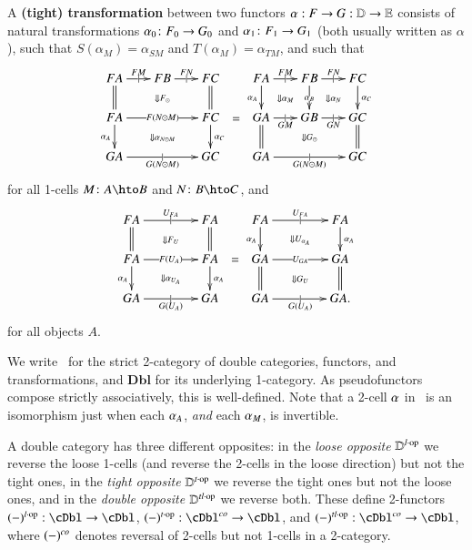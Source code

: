 \begin{defn}\label{thm:dbl-transf}
  A \textbf{(tight) transformation} between two functors $\alpha:
  F\to G:\mathbb{D}\to\mathbb{E}$ consists of natural transformations $\alpha_0\colon
  F_0\to G_0$ and $\alpha_1\colon F_1\to G_1$ (both usually written as
  $\alpha$), such that $S(\alpha_{M}) = \alpha_{SM}$ and
  $T(\alpha_{M}) = \alpha_{TM}$, and such that
  \[\vcenter{\xymatrix@-.5pc{
      FA \ar@{=}[d] \ar[r]|{|}^{FM}
      \ar@{}[drr]|{\Downarrow F_\odot} &
      FB \ar[r]|{|}^{FN} &
      FC \ar@{=}[d]\\
      FA \ar[rr]|{F(N\odot M)} \ar[d]_{\alpha_A}
      \ar@{}[drr]|{\Downarrow \alpha_{N\odot M}} &&
      FC \ar[d]^{\alpha_C}\\
      GA \ar[rr]|{|}_{G(N\odot M)} && GC
    }} =
  \vcenter{\xymatrix@-.5pc{
      FA \ar[d]_{\alpha_A} \ar@{}[dr]|{\Downarrow \alpha_M} \ar[r]|{|}^{FM} &
      FB \ar[d]|{\alpha_B} \ar@{}[dr]|{\Downarrow \alpha_N} \ar[r]|{|}^{FN} &
      FC \ar[d]^{\alpha_C}\\
      GA \ar@{=}[d] \ar[r]|{|}_{GM} \ar@{}[drr]|{\Downarrow G_\odot} &
      GB \ar[r]|{|}_{GN} &
      GC \ar@{=}[d]\\
      GA \ar[rr]|{|}_{G(N\odot M)} && GC
    }}\]
  for all 1-cells $M\colon A\hto B$ and $N\colon B\hto C$, and
  \[\vcenter{\xymatrix@-.5pc{
      FA \ar[rr]|{|}^{U_{FA}} \ar@{=}[d]
      \ar@{}[drr]|{\Downarrow F_U} &&
      FA \ar@{=}[d]\\
      FA \ar[rr]|{F(U_A)} \ar[d]_{\alpha_A}
      \ar@{}[drr]|{\Downarrow \alpha_{U_A}} &&
      FA \ar[d]^{\alpha_A}\\
      GA \ar[rr]|{|}_{G(U_A)} && GA
    }} =
  \vcenter{\xymatrix@-.5pc{
      FA \ar[rr]|{|}^{U_{FA}} \ar[d]_{\alpha_A}
      \ar@{}[drr]|{\Downarrow U_{\alpha_A}} &&
      FA \ar[d]^{\alpha_A}\\
      GA \ar[rr]|{U_{GA}} \ar@{=}[d]
      \ar@{}[drr]|{\Downarrow G_U} &&
      GA \ar@{=}[d]\\
      GA \ar[rr]|{|}_{G(U_A)} && GA.
    }}\]
  for all objects $A$.
\end{defn}

We write \cDbl\ for the strict 2-category of double categories, functors, and transformations, and $\mathbf{Dbl}$ for its underlying 1-category. As pseudofunctors compose strictly associatively, this is well-defined. Note that a 2-cell $\alpha$ in \cDbl\ is an isomorphism just when each
$\alpha_A$, \emph{and} each $\alpha_M$, is invertible.

\begin{rmk}
  A double category has three different opposites:
  in the \emph{loose opposite} $\mathbb{D}^{l\cdot\mathrm{op}}$ we reverse the loose 1-cells (and reverse the 2-cells in the loose direction) but not the tight ones, in the \emph{tight opposite} $\mathbb{D}^{t\cdot\mathrm{op}}$ we reverse the tight ones but not the loose ones, and in the \emph{double opposite} $\mathbb{D}^{tl\cdot\mathrm{op}}$ we reverse both.
  These define 2-functors $(-)\lop : \cDbl\to\cDbl$, $(-)\ttop : \cDbl\co \to \cDbl$, and $(-)\tlop : \cDbl\co \to \cDbl$, where $(-)^{\mathit{co}}$ denotes reversal of 2-cells but not 1-cells in a 2-category.
\end{rmk}



